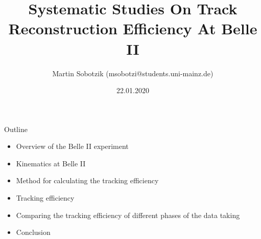 \documentclass[8pt]{beamer}
\title{{\myfont Systematic Studies On Track Reconstruction Efficiency At Belle II}}
\date{22.01.2020}
\author{Martin Sobotzik (msobotzi@students.uni-mainz.de)}
\institute{Johannes Gutenberg-Universit\"at Mainz}
\begin{document}
	
\begin{frame}[noframenumbering]
	\titlepage


	
\end{frame}



	
	



%


\newcommand{\boundellipse}[3]%
{(#1) ellipse (#2 and #3)
}

\begin{frame}{Outline}




	\begin{itemize}
		\item Overview of the Belle II experiment
		\item Kinematics at Belle II
		\item Method for calculating the tracking efficiency
		\item Tracking efficiency
		\item Comparing the tracking efficiency of different phases of the data taking
		\item Conclusion
		
		
	\end{itemize}
\end{frame}
\end{document}
